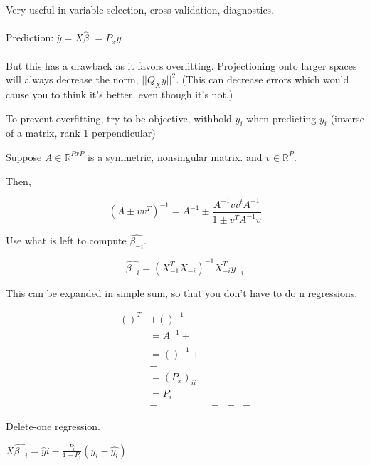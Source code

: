 \documentclass[11pt,fleqn]{book} %
\begin{document}
Very useful in variable selection, cross validation, diagnostics.\\
\\ 
Prediction: $\hat{y} = X \hat{\beta}$
	$= P_x y$\\
\\
But this has a drawback as it favors overfitting. Projectioning onto larger spaces will always decrease the norm,  $||Q_Xy ||^2$. (This can decrease errors which would cause you to think it's better, even though it's not.)

To prevent overfitting, try to be objective, withhold $y_i$ when predicting $y_i$ (inverse of a matrix, rank 1 perpendicular)

\begin{theorem}
	Suppose $A \in \mathbb{R}^{PxP}$ is a symmetric, nonsingular matrix. and $v \in \mathbb{R}^P$. 

	Then, 

	$$(A \pm vv^T)^{-1} = A^{-1} \pm \frac{A^{-1}vv^t A^{-1}}{1 \pm v^TA^{-1}v}$$
\end{theorem}


Use what is left to compute $\hat{\beta_{-i}}$.

$$\hat{\beta_{-i}} = (X^T_{-1}X_{-i})^{-1}X^T_{-i} y_{-i}$$

This can be expanded in simple sum, so that you don't have to do n regressions.

\begin{align*}
	()^T &+ ()^{-1}\\
	&=A^{-1} + \frac{}{}\\
	&=()^{-1} + \frac{}{}\\
	&= \\
	&= (P_x)_{ii}\\
	&= P_i\\
	&=
	&=
	&=
	&=
\end{align*}

Delete-one regression. 

$X\hat{\beta_{-i}} = \hat{y}i - \frac{P_i}{1 - P_i} (y_i - \hat{y_i})$


\end{document}
